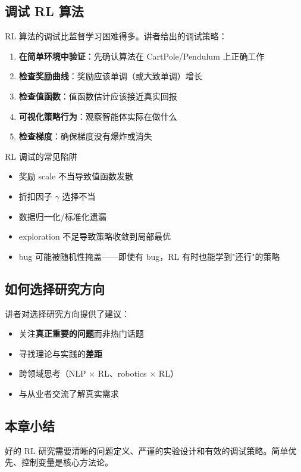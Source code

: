 \subsection{调试 RL 算法}

RL 算法的调试比监督学习困难得多。讲者给出的调试策略：

\begin{enumerate}
    \item \textbf{在简单环境中验证}：先确认算法在 CartPole/Pendulum 上正确工作
    \item \textbf{检查奖励曲线}：奖励应该单调（或大致单调）增长
    \item \textbf{检查值函数}：值函数估计应该接近真实回报
    \item \textbf{可视化策略行为}：观察智能体实际在做什么
    \item \textbf{检查梯度}：确保梯度没有爆炸或消失
\end{enumerate}

\begin{warningbox}{RL 调试的常见陷阱}
\begin{itemize}
    \item 奖励 scale 不当导致值函数发散
    \item 折扣因子 $\gamma$ 选择不当
    \item 数据归一化/标准化遗漏
    \item exploration 不足导致策略收敛到局部最优
    \item bug 可能被随机性掩盖——即使有 bug，RL 有时也能学到"还行"的策略
\end{itemize}
\end{warningbox}

\subsection{如何选择研究方向}

讲者对选择研究方向提供了建议：
\begin{itemize}
    \item 关注\textbf{真正重要的问题}而非热门话题
    \item 寻找理论与实践的\textbf{差距}
    \item 跨领域思考（NLP $\times$ RL、robotics $\times$ RL）
    \item 与从业者交流了解真实需求
\end{itemize}

\subsection{本章小结}

好的 RL 研究需要清晰的问题定义、严谨的实验设计和有效的调试策略。简单优先、控制变量是核心方法论。

